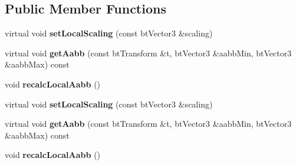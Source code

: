 \subsection*{Public Member Functions}
\begin{DoxyCompactItemize}
\item 
\mbox{\label{classbtConvexInternalAabbCachingShape_a21985e402d4226e8ef1ac616dbbc250d}} 
virtual void {\bfseries set\+Local\+Scaling} (const bt\+Vector3 \&scaling)
\item 
\mbox{\label{classbtConvexInternalAabbCachingShape_a40b3ced911e798efac47179ecbff1f38}} 
virtual void {\bfseries get\+Aabb} (const bt\+Transform \&t, bt\+Vector3 \&aabb\+Min, bt\+Vector3 \&aabb\+Max) const
\item 
\mbox{\label{classbtConvexInternalAabbCachingShape_a814b5ec6b3b24265e9a6e6e4dbbeb575}} 
void {\bfseries recalc\+Local\+Aabb} ()
\item 
\mbox{\label{classbtConvexInternalAabbCachingShape_aba6b932fedfc034e7ccde83b169b93d2}} 
virtual void {\bfseries set\+Local\+Scaling} (const bt\+Vector3 \&scaling)
\item 
\mbox{\label{classbtConvexInternalAabbCachingShape_aef4aebfe2358068e9802ff0c7ffa10d9}} 
virtual void {\bfseries get\+Aabb} (const bt\+Transform \&t, bt\+Vector3 \&aabb\+Min, bt\+Vector3 \&aabb\+Max) const
\item 
\mbox{\label{classbtConvexInternalAabbCachingShape_a814b5ec6b3b24265e9a6e6e4dbbeb575}} 
void {\bfseries recalc\+Local\+Aabb} ()
\end{DoxyCompactItemize}
